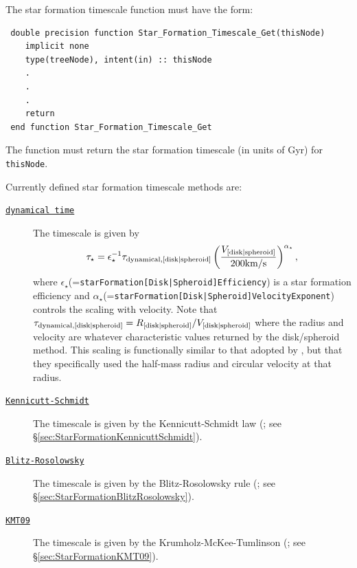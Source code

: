 The star formation timescale function must have the form:
\begin{verbatim}
 double precision function Star_Formation_Timescale_Get(thisNode)
    implicit none
    type(treeNode), intent(in) :: thisNode
    .
    .
    .
    return
 end function Star_Formation_Timescale_Get
\end{verbatim}
The function must return the star formation timescale (in units of Gyr) for {\tt thisNode}.

Currently defined star formation timescale methods are:
\begin{description}
 \item [\hyperlink{star_formation.timescales.disks.dynamical_time.F90:star_formation_timescale_disks_dynamical_time:star_formation_timescale_disk_dynamical_time}{{\tt dynamical time}}]  The timescale is given by
\begin{equation}
 \tau_\star = \epsilon_\star^{-1} \tau_{\rm dynamical, [disk|spheroid]} \left( {V_{\rm [disk|spheroid]} \over 200\hbox{km/s}} \right)^{\alpha_\star},
\end{equation}
where $\epsilon_\star$(={\tt starFormation[Disk|Spheroid]Efficiency}) is a star formation efficiency and $\alpha_\star$(={\tt starFormation[Disk|Spheroid]VelocityExponent}) controls the scaling with velocity. Note that $\tau_{\rm dynamical,[disk|spheroid]}=R_{\rm [disk|spheroid]}/V_{\rm [disk|spheroid]}$ where the radius and velocity are whatever characteristic values returned by the disk/spheroid method. This scaling is functionally similar to that adopted by \cite{cole_hierarchical_2000}, but that they specifically used the half-mass radius and circular velocity at that radius.
 \item [\hyperlink{star_formation.timescales.disks.Kennicutt-Schmidt.F90:star_formation_timescale_disks_kennicutt_schmidt:star_formation_timescale_disk_kennicutt_schmidt}{{\tt Kennicutt-Schmidt}}] The timescale is given by the Kennicutt-Schmidt law (\citealt{schmidt_rate_1959,kennicutt_global_1998}; see \S\ref{sec:StarFormationKennicuttSchmidt}).
 \item [\hyperlink{star_formation.timescales.disks.Blitz-Rosolowsky.F90:star_formation_timescale_disks_blitz_rosolowsky:star_formation_timescale_disk_blitz_rosolowsky}{{\tt Blitz-Rosolowsky}}] The timescale is given by the Blitz-Rosolowsky rule (\citealt{blitz_role_2006}; see \S\ref{sec:StarFormationBlitzRosolowsky}).
 \item [\hyperlink{star_formation.timescales.disks.KMT09.F90:star_formation_timescale_disks_kmt09:star_formation_timescale_disk_kmt09}{{\tt KMT09}}] The timescale is given by the Krumholz-McKee-Tumlinson (\citealt{krumholz_star_2009}; see \S\ref{sec:StarFormationKMT09}).
\end{description}

